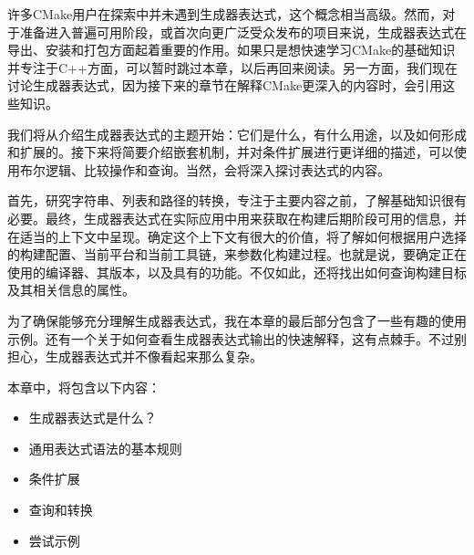 许多CMake用户在探索中并未遇到生成器表达式，这个概念相当高级。然而，对于准备进入普遍可用阶段，或首次向更广泛受众发布的项目来说，生成器表达式在导出、安装和打包方面起着重要的作用。如果只是想快速学习CMake的基础知识并专注于C++方面，可以暂时跳过本章，以后再回来阅读。另一方面，我们现在讨论生成器表达式，因为接下来的章节在解释CMake更深入的内容时，会引用这些知识。

我们将从介绍生成器表达式的主题开始：它们是什么，有什么用途，以及如何形成和扩展的。接下来将简要介绍嵌套机制，并对条件扩展进行更详细的描述，可以使用布尔逻辑、比较操作和查询。当然，会将深入探讨表达式的内容。

首先，研究字符串、列表和路径的转换，专注于主要内容之前，了解基础知识很有必要。最终，生成器表达式在实际应用中用来获取在构建后期阶段可用的信息，并在适当的上下文中呈现。确定这个上下文有很大的价值，将了解如何根据用户选择的构建配置、当前平台和当前工具链，来参数化构建过程。也就是说，要确定正在使用的编译器、其版本，以及具有的功能。不仅如此，还将找出如何查询构建目标及其相关信息的属性。

为了确保能够充分理解生成器表达式，我在本章的最后部分包含了一些有趣的使用示例。还有一个关于如何查看生成器表达式输出的快速解释，这有点棘手。不过别担心，生成器表达式并不像看起来那么复杂。

本章中，将包含以下内容：

\begin{itemize}
\item
生成器表达式是什么？

\item
通用表达式语法的基本规则

\item
条件扩展

\item
查询和转换

\item
尝试示例
\end{itemize}

































